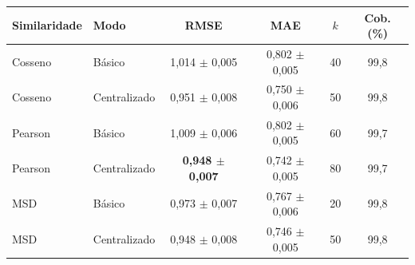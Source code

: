 \begin{tabular}{llcccc}
\hline
Similaridade & Modo & RMSE & MAE & $k$ & Cob. (\%) \\
\hline
Cosseno & B\'asico & 1,014 $\pm$ 0,005 & 0,802 $\pm$ 0,005 & 40 & 99,8 \\
Cosseno & Centralizado & 0,951 $\pm$ 0,008 & 0,750 $\pm$ 0,006 & 50 & 99,8 \\
Pearson & B\'asico & 1,009 $\pm$ 0,006 & 0,802 $\pm$ 0,005 & 60 & 99,7 \\
Pearson & Centralizado & \textbf{0,948 $\pm$ 0,007} & 0,742 $\pm$ 0,005 & 80 & 99,7 \\
MSD & B\'asico & 0,973 $\pm$ 0,007 & 0,767 $\pm$ 0,006 & 20 & 99,8 \\
MSD & Centralizado & 0,948 $\pm$ 0,008 & 0,746 $\pm$ 0,005 & 50 & 99,8 \\
\hline
\end{tabular}
